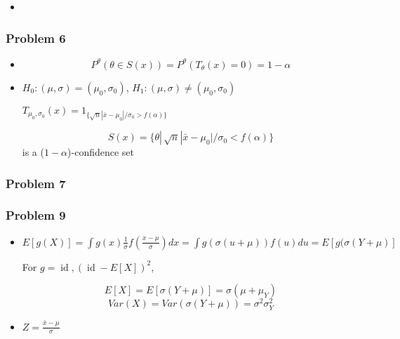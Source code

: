 \documentclass[12pt]{article}
\newcommand{\Q}[1]{\subsubsection*{Problem #1}}
\begin{document}
\begin{itemize}
\begin{itemize}
\item 

\end{itemize}


\Q{6}
\begin{itemize}
\item $$P^{\theta}(\theta \in S(x)) = P^{\theta}(T_{\theta}(x) = 0) = 1 - \alpha$$

\item 

$H_0: (\mu, \sigma) = (\mu_0, \sigma_0)$,
$H_1: (\mu, \sigma) \ne (\mu_0, \sigma_0)$

$T_{\mu_0, \sigma_0}(x) = 1_{\{\sqrt n |\bar x - \mu_0| / \sigma_0 > f(\alpha) \} }$

$$S(x) = \{ \theta |\, \sqrt n |\bar x - \mu_0| / \sigma_0 < f(\alpha) \}
$$ is a ($1-\alpha$)-confidence set

\end{itemize}


\Q{7}
\Q{9}

\begin{itemize}
\item $E[g(X)] = \int g(x) \frac 1 {\sigma} f(\frac{x - \mu}{\sigma}) dx = \int g(\sigma(u+\mu))  f(u) du = E[g(\sigma(Y + \mu)]$

For $g = \operatorname{id}, (\operatorname{id} - E[X] )^2$, 

$$E[X] = E[\sigma(Y + \mu)] = \sigma(\mu + \mu_Y)$$
$$Var(X) = Var(\sigma(Y + \mu)) = \sigma^2 \sigma_Y^2$$

\item

$Z = \frac{\bar x - \mu}{\sigma} $
\end{itemize}


\end{itemize}
\end{document}

